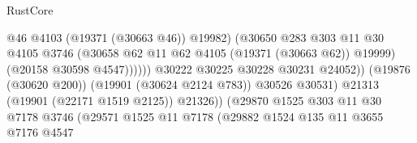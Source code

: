\begin{lexlean}{RustCore}
\begin{coremodule}
                                                      @46
                                                      @4103
                                                      (@19371 (@30663 @46))
                                                      @19982)
                                                    (@30650
                                                      @283
                                                      @303
                                                      @11
                                                      @30
                                                      @4105
                                                      @3746
                                                      (@30658
                                                        @62
                                                        @11
                                                        @62
                                                        @4105
                                                        (@19371 (@30663 @62))
                                                        @19999)
                                                      (@20158 @30598 @4547))))))
                                            @30222
                                            @30225
                                            @30228
                                            @30231
                                            @24052))
                                        (@19876 (@30620 @200))
                                        (@19901 (@30624 @2124 @783))
                                        @30526
                                        @30531)
                                      @21313
                                      (@19901 (@22171 @1519 @2125))
                                      @21326))
                                  (@29870
                                    @1525
                                    @303
                                    @11
                                    @30
                                    @7178
                                    @3746
                                    (@29571
                                      @1525
                                      @11
                                      @7178
                                      (@29882
                                        @1524
                                        @135
                                        @11
                                        @3655
                                        @7176
                                        @4547

\end{coremodule}
\end{lexlean}
